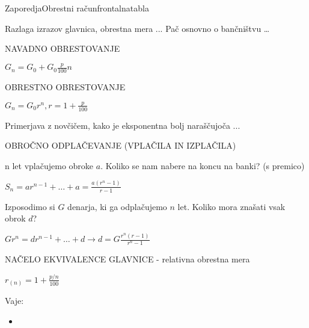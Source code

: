 \begin{priprava}{}{}{Zaporedja}{Obrestni račun}{frontalna}{tabla}


Razlaga izrazov glavnica, obrestna mera ... Pač osnovno o bančništvu \dots


NAVADNO OBRESTOVANJE

$ G_n = G_0 + G_0 \frac{p}{100} n $

OBRESTNO OBRESTOVANJE

$ G_n = G_0 r^n, r = 1 + \frac{p}{100} $

Primerjava z novčičem, kako je eksponentna bolj naraščujoča ...

OBROČNO ODPLAČEVANJE (VPLAČILA IN IZPLAČILA)

n let vplačujemo obroke $ a $. Koliko se nam nabere na koncu na banki? (s premico)

$ S_n = ar^{n-1} + \ldots + a = \frac{a(r^n - 1)}{r - 1} $

Izposodimo si $ G $ denarja, ki ga odplačujemo $ n $ let. Koliko mora znašati vsak obrok $ d $?

$ G r^n =  dr^{n-1} + \ldots + d \rightarrow d = G\frac{r^n(r - 1)}{r^n - 1} $

NAČELO EKVIVALENCE GLAVNICE - relativna obrestna mera

$ r_{(n)} = 1 + \frac{p/n}{100} $

Vaje:
\begin{itemize}
    \item
\end{itemize}

\end{priprava}